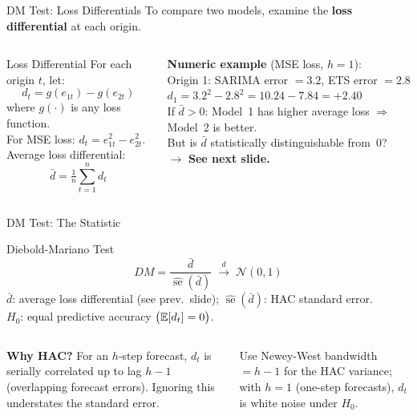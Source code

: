 \documentclass[aspectratio=169, 11pt]{beamer}
\begin{document}
\begin{frame}{DM Test: Loss Differentials}
  To compare two models, examine the \textbf{loss differential} at each origin.
  \begin{columns}[T]
      \begin{definitionbox}{Loss Differential}
        {\small
        For each origin $t$, let:
        \[
          d_t = g(e_{1t}) - g(e_{2t})
        \]
        where $g(\cdot)$ is any loss function.\\[2pt]
        For MSE loss: $d_t = e_{1t}^2 - e_{2t}^2$.\\[4pt]
        Average loss differential:
        \[
          \bar{d} = \tfrac{1}{n}\textstyle\sum_{t=1}^n d_t
        \]
        }
      \end{definitionbox}
      \textbf{Numeric example} (MSE loss, $h=1$):\\[4pt]
      {\small
      Origin 1: SARIMA error $= 3.2$, ETS error $= 2.8$\\
      $d_1 = 3.2^2 - 2.8^2 = 10.24 - 7.84 = +2.40$\\[3pt]
      If $\bar{d} > 0$: Model~1 has higher average loss $\Rightarrow$ Model~2 is better.\\[5pt]
      But is $\bar{d}$ statistically distinguishable from~0?\\
      $\to$ \textbf{See next slide.}
      }
  \end{columns}
\end{frame}

\begin{frame}{DM Test: The Statistic}
  \begin{definitionbox}{Diebold-Mariano Test \parencite{Diebold1995}}
    {\small
    \[
      DM = \frac{\bar{d}}{\widehat{\operatorname{se}}(\bar{d})}
      \;\xrightarrow{d}\; \mathcal{N}(0,1)
    \]
    \vspace{-3pt}
    {\footnotesize $\bar{d}$: average loss differential (see prev.\ slide);
    $\widehat{\operatorname{se}}(\bar{d})$: HAC standard error.}\\[3pt]
    $H_0$: equal predictive accuracy $\bigl(\mathbb{E}[d_t] = 0\bigr)$.}
  \end{definitionbox}
  \begin{columns}[T]
      \textbf{Why HAC?} For an $h$-step forecast, $d_t$ is serially
      correlated up to lag $h-1$ (overlapping forecast errors).
      Ignoring this understates the standard error.
      \begin{warningbox}
        {\small Use Newey-West bandwidth $= h-1$ for the HAC
        variance; with $h=1$ (one-step forecasts), $d_t$ is
        white noise under $H_0$.}
      \end{warningbox}
  \end{columns}
\end{frame}
\end{document}
